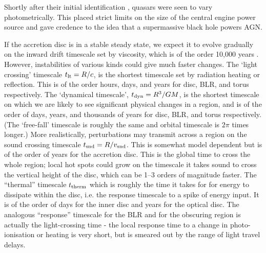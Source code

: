 \documentclass{nature}
\begin{document}

Shortly after their initial identification \citep{Schmidt63,
Hazard63}, quasars were seen to vary photometrically. This placed
strict limits on the size of the central engine power source and gave
credence to the idea that a supermassive black hole powers AGN.

If the accretion disc is in a stable steady state, we expect it to
evolve gradually on the inward drift timescale set by viscosity, which
is of the order 10,000 years \citep[see e.g., ][]{Netzer13,
Lawrence16}. However, instabilities of various kinds could give much
faster changes. The `light crossing' timescale $t_{\rm lt} = R/c$, is
the shortest timescale set by radiation heating or reflection. This is
of the order hours, days, and years for disc, BLR, and torus
respectively. The `dynamical timescale', $t_{\rm dyn} = R^{3}/GM$, is
the shortest timescale on which we are likely to see significant
physical changes in a region, and is of the order of days, years, and
thousands of years for disc, BLR, and torus respectively. (The
`free-fall' timescale is roughly the same and orbital timescale is
$2\pi$ times longer.) More realistically, perturbations may transmit
across a region on the sound crossing timescale $t_{\rm snd} =
R/v_{\rm snd}$. This is somewhat model dependent but is of the order
of years for the accretion disc. This is the global time to cross the
whole region; local hot spots could grow on the timescale it takes
sound to cross the vertical height of the disc, which can be 1–3
orders of magnitude faster. The ``thermal'' timescale $t_{\rm therm}$
which is roughly the time it takes for for energy to dissipate within
the disc, i.e. the response timescale to a spike of energy input. It
is of the order of days for the inner disc and years for the optical
disc. The analogous ``response'' timescale for the BLR and for the
obscuring region is actually the light-crossing time - the local
response time to a change in photo-ionisation or heating is very
short, but is smeared out by the range of light travel delays.
\end{document}
